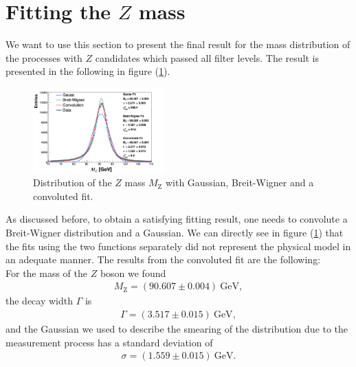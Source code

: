\documentclass[twocolumn,
			   showpacs,%
               nofootinbib,
               aps,%
               prd,
               notitlepage,
               showkeys,
               10pt]{revtex4-1}
\begin{document}
\section{Fitting the $Z$ mass}

We want to use this section to present the final result for the mass distribution of the processes with $Z$ candidates which passed all filter levels. The result is presented in the following in figure (\ref{fig:MassDist}).

\begin{figure}[H]
	\centering
	\includegraphics[width = 0.45\textwidth]{figures/plots/ZMass_corr}
	\caption{Distribution of the $Z$ mass $M_{\mathrm{Z}}$ with Gaussian, Breit-Wigner and a convoluted fit.}
	\label{fig:MassDist}
\end{figure}

As discussed before, to obtain a satisfying fitting result, one needs to convolute a Breit-Wigner distribution and a Gaussian. We can directly see in figure (\ref{fig:MassDist}) that the fits using the two functions separately did not represent the physical model in an adequate manner.
The results from the convoluted fit are the following: \\

For the mass of the $Z$ boson we found
\begin{align}
	M_{\mathrm{Z}} = (90.607 \pm 0.004) \ \text{GeV},
\end{align} 
the decay width $\Gamma$ is
\begin{align}
\Gamma = (3.517 \pm 0.015) \ \text{GeV},	
\end{align}
and the Gaussian we used to describe the smearing of the distribution due to the measurement process has a standard deviation of 
\begin{align}
	\sigma = (1.559 \pm 0.015) \ \text{GeV}.
\end{align}
\end{document}
